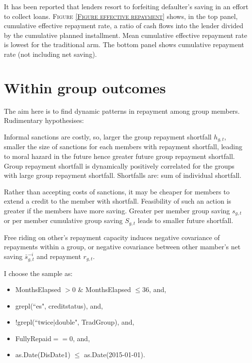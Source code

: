 \begin{palepinkleftbar}
\begin{finding}
It has been reported that lenders resort to forfeiting defaulter's saving in an effort to collect loans. \textsc{\small Figure \ref{Figure effective repayment}} shows, in the top panel, cumulative effective repayment rate, a ratio of cash flows into the lender divided by the cumulative planned installment. Mean cumulative effective repayment rate is lowest for the traditional arm. The bottom panel shows cumulative repayment rate (not including net saving). 
\end{finding}
\end{palepinkleftbar}





\section{Within group outcomes}


The aim here is to find dynamic patterns in repayment among group members. Rudimentary hypothesises:
\begin{description}
\vspace{1.0ex}\setlength{\itemsep}{1.0ex}\setlength{\baselineskip}{12pt}
\item[positive dynamic covariance of group repayment shortfall/misses]	Informal sanctions are costly, so, larger the group repayment shortfall $h_{g,t}$, smaller the size of sanctions for each members with repayment shortfall, leading to moral hazard in the future hence greater future group repayment shortfall. Group repayment shortfall is dynamically positively correlated for the groups with large group repayment shortfall. Shortfalls are: sum of individual shortfall.
\item[negative covariance with past saving and group repayment shortfall/misses]	Rather than accepting costs of sanctions, it may be cheaper for members to extend a credit to the member with shortfall. Feasibility of such an action is greater if the members have more saving. Greater per member group saving $s_{g,t}$ or per member cumulative group saving $S_{g,t}$ leads to smaller future shortfall.
\item[negative covariance of repayment/misses between group members]	Free riding on other's repayment capacity induces negative covariance of repayments within a group, or negative covariance between other mamber's net saving $\bar{s}^{-i}_{g,t}$ and repayment $r_{g,t}$. 
\end{description}
I choose the sample as:
\begin{itemize}
\vspace{1.0ex}\setlength{\itemsep}{1.0ex}\setlength{\baselineskip}{12pt}
\item	MonthsElapsed $> 0$ \& MonthsElapsed $\leqslant 36$, and,
\item	grepl(``es", creditstatus), and,
\item	$!$grepl(``twice$|$double", TradGroup), and,
\item	FullyRepaid$== 0$, and,
\item	as.Date(DisDate1) $\leqslant$ as.Date(2015-01-01).
\end{itemize}

